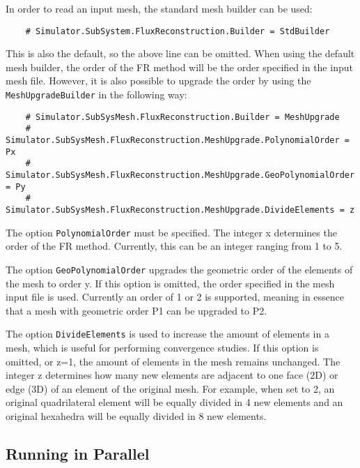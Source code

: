 \documentclass[11pt]{article}
\begin{document}
In order to read an input mesh, the standard mesh builder can be used:
\begin{verbatim}
    # Simulator.SubSystem.FluxReconstruction.Builder = StdBuilder
\end{verbatim}
This is also the default, so the above line can be omitted. When using the default mesh builder, the order of the FR method will be the order specified in the input mesh file. However, it is also possible to upgrade the order by using the {\tt MeshUpgradeBuilder} in the following way:
\begin{verbatim}
    # Simulator.SubSysMesh.FluxReconstruction.Builder = MeshUpgrade
    # Simulator.SubSysMesh.FluxReconstruction.MeshUpgrade.PolynomialOrder = Px
    # Simulator.SubSysMesh.FluxReconstruction.MeshUpgrade.GeoPolynomialOrder = Py
    # Simulator.SubSysMesh.FluxReconstruction.MeshUpgrade.DivideElements = z
\end{verbatim}
The option {\tt PolynomialOrder} must be specified. The integer x determines the order of the FR method. Currently, this can be an integer ranging from 1 to 5. 

The option {\tt GeoPolynomialOrder} upgrades the geometric order of the elements of the mesh to order y. If this option is omitted, the order specified in the mesh input file is used. Currently an order of 1 or 2 is supported, meaning in essence that a mesh with geometric order P1 can be upgraded to P2.

The option {\tt DivideElements} is used to increase the amount of elements in a mesh, which is useful for performing convergence studies. If this option is omitted, or z=1, the amount of elements in the mesh remains unchanged. The integer z determines how many new elements are adjacent to one face (2D) or edge (3D) of an element of the original mesh. For example, when set to 2, an original quadrilateral element will be equally divided in 4 new elements and an original hexahedra will be equally divided in 8 new elements.

\subsection{Running in Parallel}
\end{document}
